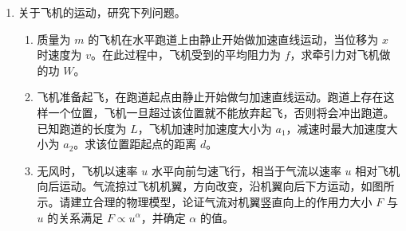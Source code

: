 \documentclass[\gkver]{gaokaozhenti}
\begin{document}
\begin{enumerate}
{粒子 2 做匀速直线运动，速度 $v_{2} = \frac{d}{t}$

所以 $\frac{v_{1}}{v_{2}} = \frac{\frac{\theta R}{t}}{\frac{d}{t}} = \frac{\theta R}{d}$

即 $v_{1}:v_{2} = \theta R:d$

b．对粒子 1，由洛伦兹力提供向心力有 $qv_{1}B = m\frac{v_{1}^{2}}{R}$

可得 $m = \frac{qBR}{v_{1}}$

粒子 2 的动量 $p_{2} = mv_{2}$

结合前面的分析可得 $p_{2} = \frac{qBR}{v_{1}} \cdot v_{2} = \frac{qBR \cdot d}{\theta R} = \frac{qBd}{\theta}$。
}

\item
关于飞机的运动，研究下列问题。
\begin{enumerate}
	\item
	质量为 $m$ 的飞机在水平跑道上由静止开始做加速直线运动，当位移为 $x$ 时速度为 $v$。在此过程中，飞机受到的平均阻力为 $f$，求牵引力对飞机做的功 $W$。
	\item
	飞机准备起飞，在跑道起点由静止开始做匀加速直线运动。跑道上存在这样一个位置，飞机一旦超过该位置就不能放弃起飞，否则将会冲出跑道。已知跑道的长度为 $L$，飞机加速时加速度大小为 $a_{1}$，减速时最大加速度大小为 $a_{2}$。求该位置距起点的距离 $d$。
	\item
	无风时，飞机以速率 $u$ 水平向前匀速飞行，相当于气流以速率 $u$ 相对飞机向后运动。气流掠过飞机机翼，方向改变，沿机翼向后下方运动，如图所示。请建立合理的物理模型，论证气流对机翼竖直向上的作用力大小 $F$ 与 $u$ 的关系满足 $F \propto u^{\alpha}$，并确定 $\alpha$ 的值。
\end{enumerate}

\onepicture[w=5.00cm, h=5.71cm, align=right]{}

\end{enumerate}
\end{document}
